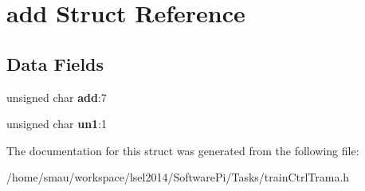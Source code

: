 \hypertarget{structadd}{\section{add Struct Reference}
\label{structadd}
}
\subsection*{Data Fields}
\begin{DoxyCompactItemize}
\item 
\hypertarget{structadd_a7172362759873b4b1ed3061ea0ec24b1}{unsigned char {\bfseries add}\-:7}\label{structadd_a7172362759873b4b1ed3061ea0ec24b1}

\item 
\hypertarget{structadd_ab38379eb3afc3bde94c63853da5c4f1c}{unsigned char {\bfseries un1}\-:1}\label{structadd_ab38379eb3afc3bde94c63853da5c4f1c}

\end{DoxyCompactItemize}


The documentation for this struct was generated from the following file\-:\begin{DoxyCompactItemize}
\item 
/home/smau/workspace/lsel2014/\-Software\-Pi/\-Tasks/train\-Ctrl\-Trama.\-h\end{DoxyCompactItemize}
